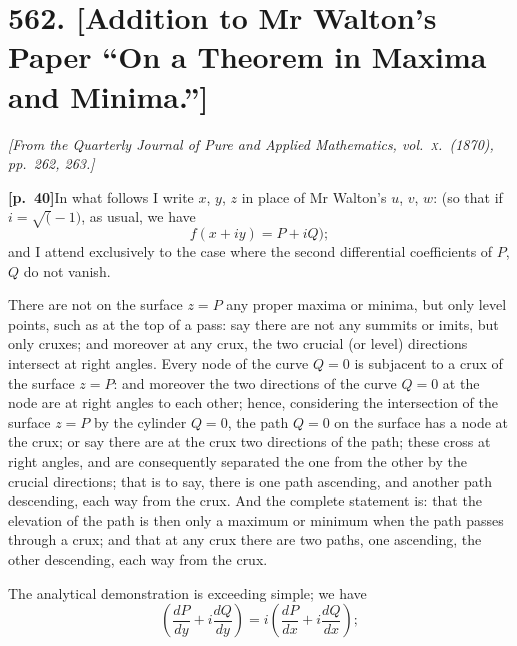 \documentclass[11pt,a4paper]{article}
\begin{document}
\bigskip

\section*{\textbf{562.} [Addition to Mr Walton's Paper ``On a Theorem in Maxima and Minima.'']}

\noindent\textit{[From the Quarterly Journal of Pure and Applied Mathematics, vol.\ \textsc{x}.\ (1870), pp.~262, 263.]}

\bigskip

\noindent\textbf{[p.~40]}\quad In what follows I write $x$, $y$, $z$ in place of Mr Walton's $u$, $v$, $w$: (so that if $i = \surd(-1)$, as usual, we have
\[
f(x+iy) = P + iQ);
\]
and I attend exclusively to the case where the second differential coefficients of $P$, $Q$ do not vanish.

There are not on the surface $z = P$ any proper maxima or minima, but only level points, such as at the top of a pass: say there are not any summits or imits, but only cruxes; and moreover at any crux, the two crucial (or level) directions intersect at right angles. Every node of the curve $Q=0$ is subjacent to a crux of the surface $z = P$: and moreover the two directions of the curve $Q=0$ at the node are at right angles to each other; hence, considering the intersection of the surface $z = P$ by the cylinder $Q = 0$, the path $Q = 0$ on the surface has a node at the crux; or say there are at the crux two directions of the path; these cross at right angles, and are consequently separated the one from the other by the crucial directions; that is to say, there is one path ascending, and another path descending, each way from the crux. And the complete statement is: that the elevation of the path is then only a maximum or minimum when the path passes through a crux; and that at any crux there are two paths, one ascending, the other descending, each way from the crux.

The analytical demonstration is exceeding simple; we have
\[
\left(\frac{dP}{dy} + i\frac{dQ}{dy}\right) = i\left(\frac{dP}{dx} + i\frac{dQ}{dx}\right);
\]
\end{document}
